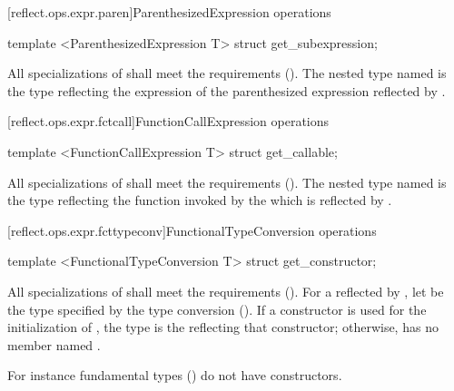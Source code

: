 [reflect.ops.expr.paren]{ParenthesizedExpression operations}
\begin{std.txt}\color{addclr}
\begin{itemdecl}
template <ParenthesizedExpression T> struct get_subexpression;
\end{itemdecl}
\begin{itemdescr}
\pnum
      All specializations of  shall meet the  requirements (). The nested type named  is the  type reflecting the expression  of the parenthesized expression  reflected by . 
\end{itemdescr}
\end{std.txt}

[reflect.ops.expr.fctcall]{FunctionCallExpression operations}
\begin{std.txt}\color{addclr}
\begin{itemdecl}
template <FunctionCallExpression T> struct get_callable;
\end{itemdecl}
\begin{itemdescr}
\pnum
      All specializations of  shall meet the  requirements (). The nested type named  is the  type reflecting the function invoked by the  which is reflected by .
\end{itemdescr}
\end{std.txt}


[reflect.ops.expr.fcttypeconv]{FunctionalTypeConversion operations}
\begin{std.txt}\color{addclr}
\begin{itemdecl}
template <FunctionalTypeConversion T> struct get_constructor;
\end{itemdecl}
\begin{itemdescr}
\pnum
			All specializations of  shall meet the  requirements (). For a  reflected by , let  be the type specified by the type conversion (). If a constructor is used for the initialization of , the type  is the  reflecting that constructor; otherwise,  has no member named .
      \begin{note} For instance fundamental types () do not have constructors. \end{note}
\end{itemdescr}
\end{std.txt}

